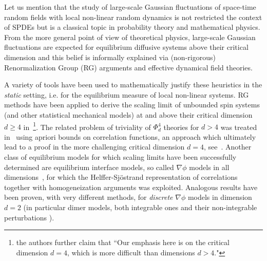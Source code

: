 \documentclass[reqno,11pt]{preprint}
\newcommand{\1}{\mathds{1}}
\begin{document}
Let us mention that the study of large-scale Gaussian fluctuations of space-time random fields 
with local non-linear random dynamics is  not restricted the context of SPDEs but
is a classical topic in probability theory and mathematical physics.
From the more general point of view of theoretical physics, large-scale Gaussian fluctuations are expected 
for equilibrium diffusive systems above their critical dimension 
and this belief is informally explained via (non-rigorous) Renormalization Group (RG) arguments 
and effective dynamical field theories. 

A variety of tools have been used to mathematically justify these heuristics in the {\it static} setting, i.e. 
for the equilibrium measure of local non-linear systems. RG methods have been applied 
to derive the scaling limit of unbounded spin systems (and other statistical mechanical models)  at and above their critical dimension $d\ge 4$  in~\cite{bauerschmidtRenormalisationGroupMethod2015a, bauerschmidtScalingLimitsCritical2014, bauerschmidtIntroductionRenormalisationGroup2019}\footnote{the authors further claim 
that ``Our emphasis here is on the critical dimension $d = 4$, which is more difficult than dimensions $d > 4$."}. 
The related problem of triviality of $\Phi^4_d$ theories for $d > 4$ was treated in~\cite{Aiz82, Fro82, fernandezRandomWalksCritical1992} using apriori bounds on correlation functions, an approach 
which ultimately lead to a proof in the more challenging critical dimension $d=4$, 
see~\cite{aizenmanMarginalTrivialityScaling2021a}. 
Another class of equilibrium models for which scaling limits have been successfully determined 
are equilibrium interface models, so called $\nabla \phi$ models in all dimensions~\cite{brydgesGradPhiPerturbations1990, naddafHomogenizationScalingLimit1997, Funaki19971,  giacominEquilibriumFluctuationsNabla2001a}, for which the Helffer-Sj\"ostrand representation of correlations together 
with homogeneization arguments was exploited. Analogous results have been proven, with very different methods, for \emph{discrete} $\nabla\phi$ models in dimension $d=2$ (in particular dimer models, both integrable ones \cite{Kenyon} and their non-integrable perturbations \cite{Giul}).
\end{document}
